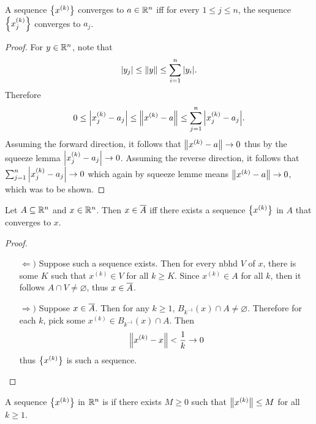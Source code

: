 \documentclass[../main.tex]{subfiles}
\begin{document}
\begin{theorem}
    A sequence $\qty{x^{(k)}}$ converges to $a \in \mathbb{R}^n$ iff for every $1 \leq j \leq n$, the sequence $\qty{x_j^{(k)}}$ converges to $a_j$.
\end{theorem}

\begin{proof}
    For $y \in \mathbb{R}^n$, note that
    \[
        |y_j| \leq \norm{y} \leq \sum_{i=1}^n |y_i|
    .\]
    Therefore
    \[
        0 \leq \qty|x_j^{(k)} - a_j| \leq \norm{x^{(k)} - a} \leq \sum_{j = 1}^n \qty|x_j^{(k)} - a_j|
    .\]
    Assuming the forward direction, it follows that $\norm{x^{(k)} - a} \to 0$ thus by the squeeze lemma $\qty|x_j^{(k)} - a_j| \to 0$. Assuming the reverse direction, it follows that $\sum_{j=1}^n \qty|x_j^{(k)} - a_j| \to 0$ which again by squeeze lemme means $\norm{x^{(k)} - a} \to 0$, which was to be shown.
\end{proof}

\begin{theorem}
    Let $A \subseteq \mathbb{R}^n$ and $x \in \mathbb{R}^n$. Then $x \in \overline{A}$ iff there exists a sequence $\qty{x^{(k)}}$ in $A$ that converges to $x$.
\end{theorem}

\begin{proof}
    \begin{enumerate}
        \item[$\Leftarrow)$]
            Suppose such a sequence exists. Then for every nbhd $V$ of $x$, there is some $K$ such that $x^{(k)} \in V$ for all $k \geq K$. Since $x^{(k)} \in A$ for all $k$, then it follows $A \cap V \neq \varnothing$, thus $x \in \overline{A}$.
        \item[$\Rightarrow)$]
            Suppose $x \in \overline{A}$. Then for any $k \geq 1$, $B_{k^{-1}}(x) \cap A \neq \varnothing$. Therefore for each $k$, pick some $x^{(k)} \in B_{k^{-1}}(x) \cap A$. Then
            \[
                \norm{x^{(k)} - x} < \frac{1}{k} \to 0
            \]
            thus $\qty{x^{(k)}}$ is such a sequence.
    \end{enumerate}
\end{proof}

\begin{definition}
    A sequence $\qty{x^{(k)}}$ in $\mathbb{R}^n$ is  if there exists $M \geq 0$ such that $\norm{x^{(k)}} \leq M$ for all $k \geq 1$.
\end{definition}
\end{document}
